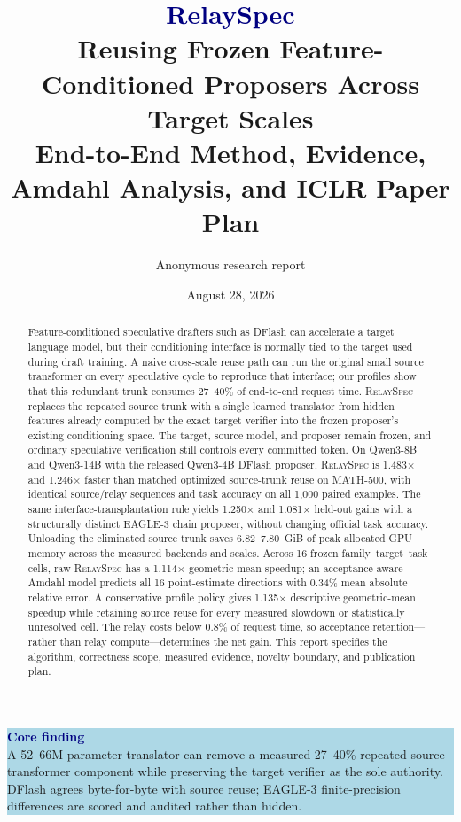 \documentclass[10pt]{article}
\title{\vspace{-1.2em}\textbf{\textcolor{navy}{RelaySpec}}\\
\large Reusing Frozen Feature-Conditioned Proposers Across Target Scales\\[3pt]
\normalsize End-to-End Method, Evidence, Amdahl Analysis, and ICLR Paper Plan}
\author{Anonymous research report}
\date{August 28, 2026}
\newcommand{\method}{\textsc{RelaySpec}}
\newcommand{\callout}[2]{%
  \begin{center}
  \colorbox{lightblue}{\parbox{0.94\linewidth}{\textbf{\textcolor{navy}{#1}}\\[-2pt]#2}}
  \end{center}
}
\begin{document}
\maketitle
\vspace{-1.4em}

\begin{abstract}
Feature-conditioned speculative drafters such as DFlash can accelerate a
target language model, but their conditioning interface is normally tied to
the target used during draft training. A naive cross-scale reuse path can run
the original small source transformer on every speculative cycle to reproduce
that interface; our profiles show that this redundant trunk consumes
27--40\% of end-to-end request time. \method{} replaces the repeated source
trunk with a single learned translator from hidden features already computed
by the exact target verifier into the frozen proposer's existing conditioning
space. The target, source model, and proposer remain frozen, and ordinary
speculative verification still controls every committed token. On Qwen3-8B
and Qwen3-14B with the released Qwen3-4B DFlash proposer, \method{} is
1.483$\times$ and 1.246$\times$ faster than matched optimized source-trunk reuse on
MATH-500, with identical source/relay sequences and task accuracy on all
1,000 paired examples. The same interface-transplantation rule yields
1.250$\times$ and 1.081$\times$ held-out gains with a structurally distinct
EAGLE-3 chain proposer, without changing official task accuracy.
Unloading the eliminated source trunk saves 6.82--7.80~GiB of peak allocated
GPU memory across the measured backends and scales. Across 16 frozen
family--target--task cells, raw \method{} has a 1.114$\times$ geometric-mean
speedup; an acceptance-aware Amdahl model predicts all 16 point-estimate
directions with 0.34\% mean absolute relative error. A conservative profile
policy gives 1.135$\times$ descriptive geometric-mean speedup while retaining
source reuse for every measured slowdown or statistically unresolved cell.
The relay costs below 0.8\% of request time, so acceptance retention---rather
than relay compute---determines the net gain. This report specifies the
algorithm, correctness scope, measured evidence, novelty boundary, and
publication plan.
\end{abstract}

\callout{Core finding}{A 52--66M parameter translator can remove a measured
27--40\% repeated source-transformer component while preserving the target
verifier as the sole authority. DFlash agrees byte-for-byte with source reuse;
EAGLE-3 finite-precision differences are scored and audited rather than hidden.}
\end{document}
